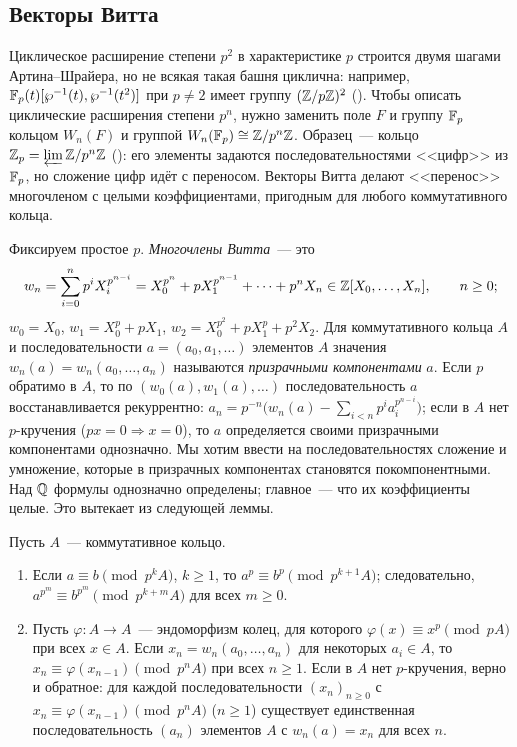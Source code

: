 \subsection*{Векторы Витта}

Циклическое расширение степени $p^2$ в характеристике $p$ строится двумя шагами Артина--Шрайера, но не всякая такая
башня циклична: например, $\mathbb F_p(t)[\wp^{-1}(t),\wp^{-1}(t^2)]$ при $p\ne2$ имеет группу $(\mathbb Z/p\mathbb Z)^2$ (). Чтобы описать
циклические расширения степени $p^n$, нужно заменить поле $F$ и группу $\mathbb F_p$ кольцом $W_n(F)$ и группой
$W_n(\mathbb F_p)\cong\mathbb Z/p^n\mathbb Z$. Образец~--- кольцо $\mathbb Z_p=\varprojlim\mathbb Z/p^n\mathbb Z$ (): его элементы задаются последовательностями
<<цифр>> из $\mathbb F_p$, но сложение цифр идёт с переносом. Векторы Витта делают <<перенос>> многочленом с целыми
коэффициентами, пригодным для любого коммутативного кольца.

Фиксируем простое $p$. \emph{Многочлены Витта}~--- это
\[
w_n=\sum_{i=0}^np^iX_i^{p^{n-i}}=X_0^{p^n}+pX_1^{p^{n-1}}+\dots+p^nX_n\in\mathbb Z[X_0,\dots,X_n],\qquad n\ge0;
\]
$w_0=X_0$, $w_1=X_0^p+pX_1$, $w_2=X_0^{p^2}+pX_1^p+p^2X_2$. Для коммутативного кольца $A$ и последовательности
$a=(a_0,a_1,\dots)$ элементов $A$ значения $w_n(a)=w_n(a_0,\dots,a_n)$ называются \emph{призрачными компонентами} $a$.
Если $p$ обратимо в $A$, то по $(w_0(a),w_1(a),\dots)$ последовательность $a$ восстанавливается рекуррентно:
$a_n=p^{-n}\bigl(w_n(a)-\sum_{i<n}p^ia_i^{p^{n-i}}\bigr)$; если в $A$ нет $p$-кручения ($px=0\Rightarrow x=0$), то $a$
определяется своими призрачными компонентами однозначно. Мы хотим ввести на последовательностях сложение и умножение,
которые в призрачных компонентах становятся покомпонентными. Над $\mathbb Q$ формулы однозначно определены; главное~--- что их
коэффициенты целые. Это вытекает из следующей леммы.

\begin{lemma}[5.32k]
Пусть $A$~--- коммутативное кольцо.
\begin{enumerate}[label=\textup{(\alph*)}]
\item Если $a\equiv b\pmod{p^kA}$, $k\ge1$, то $a^p\equiv b^p\pmod{p^{k+1}A}$; следовательно,
$a^{p^m}\equiv b^{p^m}\pmod{p^{k+m}A}$ для всех $m\ge0$.
\item Пусть $\varphi\colon A\to A$~--- эндоморфизм колец, для которого $\varphi(x)\equiv x^p\pmod{pA}$ при всех $x\in A$.
Если $x_n=w_n(a_0,\dots,a_n)$ для некоторых $a_i\in A$, то $x_n\equiv\varphi(x_{n-1})\pmod{p^nA}$ при всех $n\ge1$. Если в
$A$ нет $p$-кручения, верно и обратное: для каждой последовательности $(x_n)_{n\ge0}$ с $x_n\equiv\varphi(x_{n-1})\pmod{p^nA}$
($n\ge1$) существует единственная последовательность $(a_n)$ элементов $A$ с $w_n(a)=x_n$ для всех $n$.
\end{enumerate}
\end{lemma}

